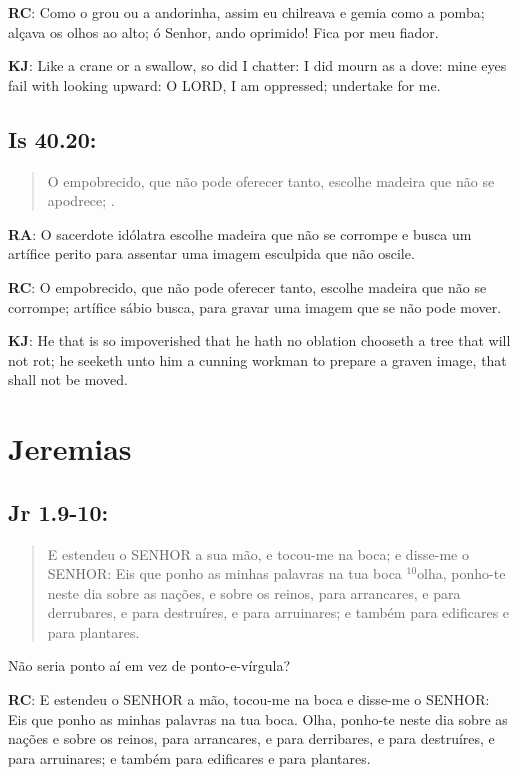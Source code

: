 \textbf{RC}: Como o grou ou a andorinha, assim eu chilreava e gemia como a pomba; alçava os olhos ao alto; ó Senhor, ando oprimido! Fica por meu fiador.

\textbf{KJ}: Like a crane or a swallow, so did I chatter: I did mourn as a dove: mine eyes fail with looking upward: O LORD, I am oppressed; undertake for me.

\subsection*{Is 40.20:} 
 \begin{quote}
  \small
 O empobrecido, que não pode oferecer tanto, escolhe madeira que não se apodrece; .
 \end{quote}

\textbf{RA}: O sacerdote idólatra escolhe madeira que não se corrompe e busca um artífice perito para assentar uma imagem esculpida que não oscile.

\textbf{RC}: O empobrecido, que não pode oferecer tanto, escolhe madeira que não se corrompe; artífice sábio busca, para gravar uma imagem que se não pode mover.

\textbf{KJ}: He that is so impoverished that he hath no oblation chooseth a tree that will not rot; he seeketh unto him a cunning workman to prepare a graven image, that shall not be moved.

\section{Jeremias}
\subsection*{Jr 1.9-10:} 
 \begin{quote}
  \small
 E estendeu o SENHOR a sua mão, e tocou-me na boca; e disse-me o SENHOR: Eis que ponho as minhas palavras na tua boca\uwave{;} $^{\mathrm{10}}$olha, ponho-te neste dia sobre as nações, e sobre os reinos, para arrancares, e para derrubares, e para destruíres, e para arruinares; e também para edificares e para plantares.
 \end{quote}

Não seria ponto aí em vez de ponto-e-vírgula?

\textbf{RC}: E estendeu o SENHOR a mão, tocou-me na boca e disse-me o SENHOR: Eis que ponho as minhas palavras na tua boca. Olha, ponho-te neste dia sobre as nações e sobre os reinos, para arrancares, e para derribares, e para destruíres, e para arruinares; e também para edificares e para plantares.

